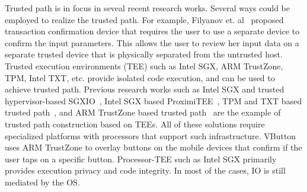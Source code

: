 
Trusted path is in focus in seveal recent research works. Several ways could be employed to realize the trusted path. For example, Filyanov et. al~\cite{filyanov2011uni} proposed transaction confirmation device that requires the user to use a separate device to confirm the input parameters. This allows the user to review her input data on a separate trusted device that is physically separated from the untrusted host. Trusted execution environments (TEE) such as Intel SGX, ARM TrustZone, TPM, Intel TXT, etc. provide isolated code execution, and can be used to achieve trusted path. Previous research works such as Intel SGX and trusted hypervisor-based SGXIO~\cite{weiser2017sgxio}, Intel SGX based ProximiTEE~\cite{dhar2018proximitee}, TPM and TXT based trusted path~\cite{filyanov2011uni}, and ARM TrustZone based trusted path~\cite{filyanov2011uni,sun2015trustotp} are the example of trusted path construction based on TEEs. All of these solutions require specialized platforms with processors that support such infrastructure. VButton~\cite{li2018vbutton} uses ARM TrustZone to overlay buttons on the mobile devices that confirm if the user taps on a specific button. Processor-TEE such as Intel SGX primarily provides execution privacy and code integrity. In most of the cases, IO is still mediated by the OS. 


